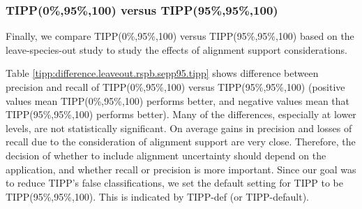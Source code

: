 \subsubsection{TIPP(0\%,95\%,100) versus TIPP(95\%,95\%,100)}
Finally, we compare TIPP(0\%,95\%,100) versus TIPP(95\%,95\%,100) based on the leave-species-out study
to study the effects of alignment support considerations.

Table \ref{tipp:difference.leaveout.rspb.sepp95.tipp} shows difference between precision and recall of 
TIPP(0\%,95\%,100) versus TIPP(95\%,95\%,100) (positive values mean TIPP(0\%,95\%,100) performs better, and negative values mean that TIPP(95\%,95\%,100) performs better). 
Many of the differences, especially at lower levels, are not statistically significant.
On average gains in precision and losses of recall due to the consideration of alignment support are very close.
Therefore, 
the decision of whether to include alignment uncertainty should depend
on the application, and whether recall or precision is more important.
Since our goal was to reduce TIPP's false classifications, we set 
the default setting for TIPP to be TIPP(95\%,95\%,100).
This is indicated by TIPP-def (or TIPP-default).

